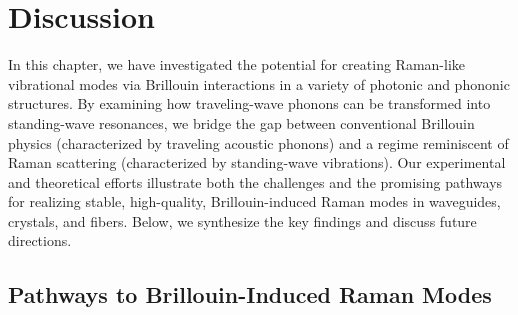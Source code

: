 
\section{Discussion}
\label{sec:Raman:Discussion}

In this chapter, we have investigated the potential for creating Raman-like vibrational modes via Brillouin interactions in a variety of photonic and phononic structures. By examining how traveling-wave phonons can be transformed into standing-wave resonances, we bridge the gap between conventional Brillouin physics (characterized by traveling acoustic phonons) and a regime reminiscent of Raman scattering (characterized by standing-wave vibrations). Our experimental and theoretical efforts illustrate both the challenges and the promising pathways for realizing stable, high-quality, Brillouin-induced Raman modes in waveguides, crystals, and fibers. Below, we synthesize the key findings and discuss future directions.

\subsection{Pathways to Brillouin-Induced Raman Modes}
\label{subsec:Raman:Pathways}

